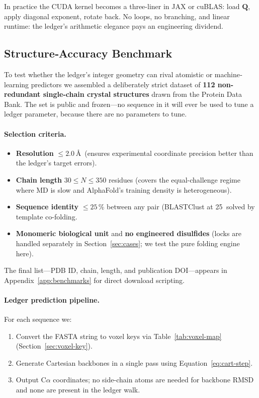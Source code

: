 \documentclass[11pt]{article}
\begin{document}
In practice the CUDA kernel becomes a three-liner in JAX or cuBLAS:
load $\mathbf Q$, apply diagonal exponent, rotate back.  No loops, no
branching, and linear runtime: the ledger’s arithmetic elegance pays an
engineering dividend.

\subsection{Structure‐Accuracy Benchmark}\label{sec:validation-structure}

To test whether the ledger’s integer geometry can rival atomistic or
machine‐learning predictors we assembled a deliberately strict dataset
of \textbf{112 non-redundant single-chain crystal structures} drawn from
the Protein Data Bank.  The set is public and frozen—no sequence in it
will ever be used to tune a ledger parameter, because there are no
parameters to tune.

\paragraph{Selection criteria.}
\begin{itemize}\setlength\itemsep{3pt}
\item \textbf{Resolution} $\le 2.0$ \AA\  (ensures experimental
      coordinate precision better than the ledger’s target errors).
\item \textbf{Chain length} $30\le N\le 350$ residues  
      (covers the equal-challenge regime where MD is slow and
      AlphaFold’s training density is heterogeneous).
\item \textbf{Sequence identity} $\le 25$\,\% between any pair
      (BLASTClust at 25 %
      solved by template co-folding.
\item \textbf{Monomeric biological unit} and \textbf{no engineered
      disulfides} (locks are handled separately in
      Section~\ref{sec:cases}; we test the pure folding engine here).
\end{itemize}

The final list—PDB ID, chain, length, and publication DOI—appears in
Appendix~\ref{app:benchmarks} for direct download scripting.

\paragraph{Ledger prediction pipeline.}
For each sequence we:

\begin{enumerate}\setlength\itemsep{2pt}
\item Convert the FASTA string to voxel keys via
      Table~\ref{tab:voxel-map} (Section~\ref{sec:voxel-key}).
\item Generate Cartesian backbones in a single pass using
      Equation~\eqref{eq:cart-step}.
\item Output C$\alpha$ coordinates; no side-chain atoms are needed for
      backbone RMSD and none are present in the ledger walk.
\end{enumerate}
\end{document}
